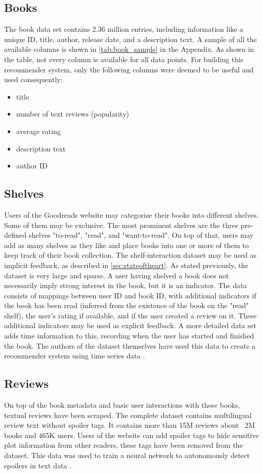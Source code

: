 \documentclass[10pt,final,journal,a4paper,oneside,twocolumn]{IEEEtran}
\begin{document}
\subsection{Books}
The book data set contains 2.36 million entries, including information like a unique ID, title, author, release date, and a description text. A sample of all the available columns is shown in \autoref{tab:book_sample} in the Appendix. As shown in the table, not every column is available for all data points.
For building this recommender system, only the following columns were deemed to be useful and used consequently:
\begin{itemize}
    \item title
    \item number of text reviews (popularity)
    \item average rating
    \item description text
    \item author ID
\end{itemize}

\subsection{Shelves}
Users of the Goodreads website may categorize their books into different shelves. Some of them may be exclusive. The most prominent shelves are the three pre-defined shelves "to-read", "read", and "want-to-read". On top of that, users may add as many shelves as they like and place books into one or more of them to keep track of their book collection.
The shelf-interaction dataset may be used as implicit feedback, as described in \autoref{sec:stateoftheart}. As stated previously, the dataset is very large and sparse. A user having shelved a book does not necessarily imply strong interest in the book, but it is an indicator. 
The data consists of mappings between user ID and book ID, with additional indicators if the book has been read (inferred from the existence of the book on the "read" shelf), the user's rating if available, and if the user created a review on it. These additional indicators may be used as explicit feedback.
A more detailed data set adds time information to this, recording when the user has started and finished the book. The authors of the dataset themselves have used this data to create a recommender system using time series data \cite{Pera.2018}.

\subsection{Reviews}
On top of the book metadata and basic user interactions with these books, textual reviews have been scraped. The complete dataset contains multilingual review text without spoiler tags. It contains more than 15M reviews about ~2M books and 465K users. Users of the website can add spoiler tags to hide sensitive plot information from other readers, these tags have been removed from the dataset. This data was used to train a neural network to autonomously detect spoilers in text data \cite{Wan.2019}.
\end{document}
